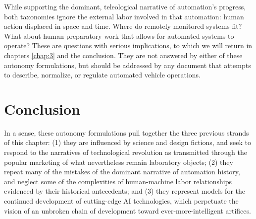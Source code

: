 While supporting the dominant, teleological narrative of automation's
progress, both
taxonomies ignore the external labor involved in that automation:
human action displaced in space and time. Where do remotely monitored
systems fit? What about human preparatory work that allows for
automated systems to operate? These are questions with serious
implications, to which we will
return in chapters \ref{chap:3} and the conclusion. They are not
answered by either of these autonomy formulations, but should be
addressed by any document that attempts to describe, normalize, or
regulate automated vehicle operations. 

\section{Conclusion}

In a sense, these autonomy
formulations pull together the three previous strands of this
chapter: (1) they are influenced by science and design fictions, and seek
to respond to the narratives of technological revolution as
transmitted through the popular marketing of what nevertheless remain laboratory
objects; (2) they repeat many of the mistakes of the dominant narrative of
automation history, and neglect some of the complexities of
human-machine labor relationships evidenced by their historical
antecedents; and (3) they represent models for the
continued development of cutting-edge AI technologies, which perpetuate
the vision of an unbroken chain of development toward
ever-more-intelligent artifices. 

